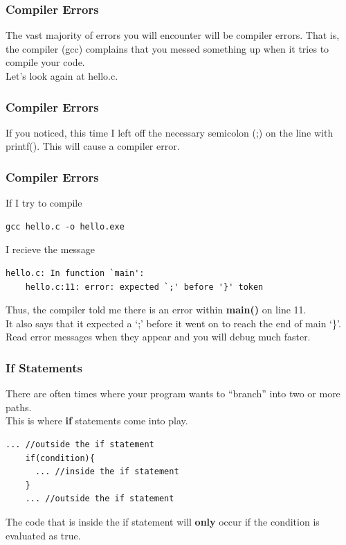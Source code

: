 \documentclass{beamer}
\begin{document}
\begin{frame}[fragile]
  \frametitle{Compiler Errors}
  The vast majority of errors you will encounter will be compiler errors. That is,
  the compiler (gcc) complains that you messed something up when it tries to compile
  your code.\\
  Let's look again at hello.c.
  
\end{frame}

\begin{frame}[fragile]
  \frametitle{Compiler Errors}
  
  If you noticed, this time I left off the necessary semicolon (;)
  on the line with printf(). This will cause a compiler error.
\end{frame}

\begin{frame}[fragile]
  \frametitle{Compiler Errors}
  If I try to compile
  \begin{lstlisting}[style=custombash]
    gcc hello.c -o hello.exe
  \end{lstlisting}
  I recieve the message
  \begin{lstlisting}[style=custombash]
    hello.c: In function `main':
    hello.c:11: error: expected `;' before '}' token
  \end{lstlisting}
  Thus, the compiler told me there is an error within \textbf{main()} on line 11.\\
  It also says that it expected a `;' before it went on to reach the end of main `\}'.\\
  Read error messages when they appear and you will debug much faster.
\end{frame}

\begin{frame}[fragile]
  \frametitle{If Statements}
  There are often times where your program wants to ``branch'' into two or more paths.\\
  This is where \textbf{if} statements come into play.
  \begin{lstlisting}[style=customc]
    ... //outside the if statement
    if(condition){
      ... //inside the if statement
    }
    ... //outside the if statement
  \end{lstlisting}
  The code that is inside the if statement will \textbf{only} occur 
  if the condition is evaluated as true.
\end{frame}
\end{document}
